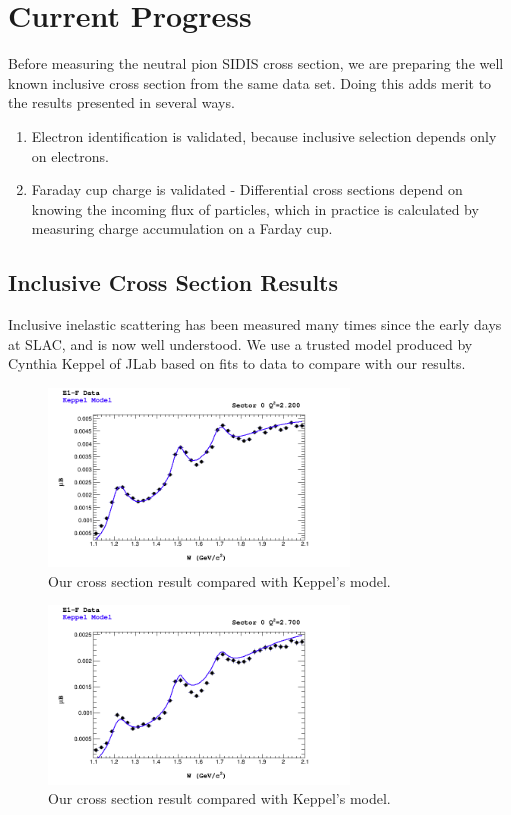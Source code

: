 \section{Current Progress}

Before measuring the neutral pion SIDIS cross section, we are preparing the well known inclusive cross section from the same data set.  Doing this adds merit to the results presented in several ways.

\begin{enumerate}
\item Electron identification is validated, because inclusive selection depends only on electrons.
\item Faraday cup charge is validated - Differential cross sections depend on knowing the incoming flux of particles, which in practice is calculated by measuring charge accumulation on a Farday cup.  
\end{enumerate}

\subsection{Inclusive Cross Section Results}

Inclusive inelastic scattering has been measured many times since the early days at SLAC, and is now well understood.  We use a trusted model produced by Cynthia Keppel of JLab based on fits to data to compare with our results.

\begin{figure}
  \centering
  \includegraphics[width=8cm]{image/compareDataModelSector0Slice2.png}
  \caption{Our cross section result compared with Keppel's model.}
  \label{fig:xs}
\end{figure}

\begin{figure}
  \centering
  \includegraphics[width=8cm]{image/compareDataModelSector0Slice4.png}
  \caption{Our cross section result compared with Keppel's model.}
\end{figure}

